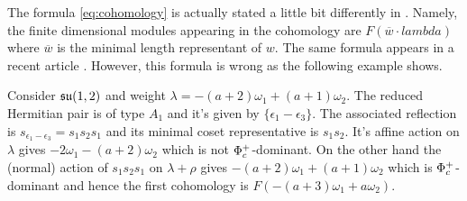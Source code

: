 \documentclass[12pt,a4paper,final]{report}
\begin{document}
%
%
%
%
\begin{remark}
 The formula \eqref{eq:cohomology} is actually stated a little bit differently in \cite{enright_analogues_1988}. Namely, the finite dimensional modules appearing in the cohomology are $F(\overline{w}\cdot lambda)$ where $\overline{w}$ is the minimal length representant of $w$. The same formula appears in a recent article \cite{enright_diagrams_2014}. However, this formula is wrong as the following example shows.

Consider $\mathfrak{su}(1,2)$ and weight $\lambda = -(a+2)\omega_1 + (a+1)\omega_2$. The reduced Hermitian pair is of type $A_1$ and it's given by $\{\epsilon_1 - \epsilon_3 \}$. The associated reflection is $s_{\epsilon_1 - \epsilon_3} = s_1 s_2 s_1$ and its minimal coset representative is $s_1 s_2$. It's affine action on $\lambda$ gives $-2\omega_1 - (a+2)\omega_2$ which is not $\Phi_c^+$-dominant. On the other hand the (normal) action of $s_1 s_2 s_1$ on $\lambda + \rho$ gives $ -(a+2)\omega_1 + (a+1)\omega_2$ which is $\Phi_c^+$-dominant and hence the first cohomology is $F(-(a+3)\omega_1 + a\omega_2).$
\end{remark}
\end{document}
